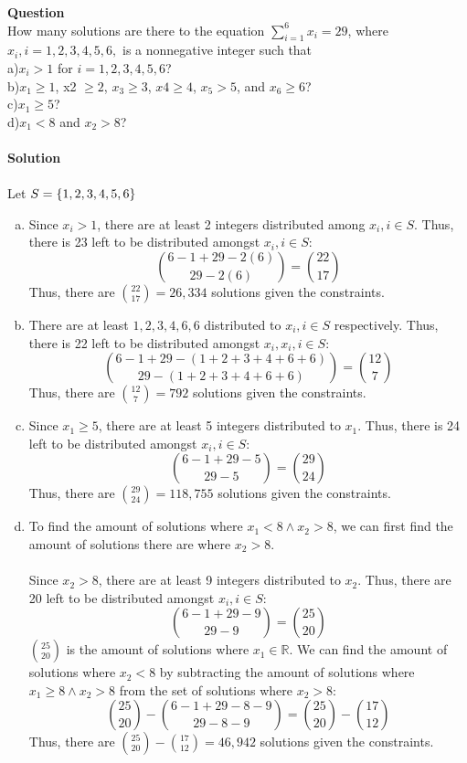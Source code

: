 \documentclass[article, 11pt]{article}
\newcounter{question}
\def\questionnum{{\Large\bfseries{Question \arabic{question} }}\\[1em]}
\newcommand{\question}{
    \stepcounter{question}
    \questionnum
}
\newcommand{\solution}{
    {{\large\bfseries{Solution}}}
}
\DeclarePairedDelimiter\set{\{}{\}}
\newcommand{\reals}{\mathbb{R}} %
\begin{document}
\newpage
\question
How many solutions are there to the equation $\sum_{i=1}^6 x_i=29$, where $x_i, i = 1, 2, 3, 4, 5, 6,$ is a nonnegative integer such that\\ a)$x_i > 1$ for $i = 1, 2, 3, 4, 5, 6$?\\ b)$x_1 \geq 1$, x2 $\geq 2$, $x_3 \geq 3$, $x4 \geq 4$, $x_5 > 5$, and $x_6 \geq 6$?\\ c)$x_1 \geq 5$? \\ d)$x_1 < 8$ and $x_2 > 8$? \\
\\
\solution \\
\\
Let $S=\set*{1,2,3,4,5,6}$
\begin{enumerate}[a)]
    \item 
    Since $x_i > 1$, there are at least 2 integers distributed among $x_i, i \in S$. Thus, there is 23 left to be distributed amongst $x_i, i \in S$:
    \[ \binom{6-1+29-2(6)}{29-2(6)} = \binom{22}{17} \]
    Thus, there are $\binom{22}{17} = 26,334$ solutions given the constraints.
    \item 
    There are at least $1,2,3,4,6,6$ distributed to $x_i, i \in S$ respectively. Thus, there is 22 left to be distributed amongst $x_i, x_i, i \in S$:
    \[ \binom{6-1+29-(1+2+3+4+6+6)}{29-(1+2+3+4+6+6)} = \binom{12}{7} \]
    Thus, there are $\binom{12}{7} = 792$ solutions given the constraints.
    \item
    Since $x_1 \geq 5$, there are at least 5 integers distributed to $x_1$. Thus, there is 24 left to be distributed amongst $x_i, i \in S$: 
    \[ \binom{6-1+29-5}{29-5} = \binom{29}{24} \]    
    Thus, there are $\binom{29}{24} = 118,755$ solutions given the constraints.
    \item 
    To find the amount of solutions where $x_1 < 8 \land x_2 > 8$, we can first find the amount of solutions there are where $x_2 > 8$. \\
    \\
    Since $x_2 > 8$, there are at least 9 integers distributed to $x_2$. Thus, there are 20 left to be distributed amongst $x_i, i \in S$:
    \[ \binom{6-1+29-9}{29-9} = \binom{25}{20} \]
    $\displaystyle\binom{25}{20}$ is the amount of solutions where $x_1 \in \reals$. We can find the amount of solutions where $x_2 < 8$ by subtracting the amount of solutions where $x_1 \geq 8 \land x_2 > 8$ from the set of solutions where $x_2 > 8$:
    \[ \binom{25}{20} - \binom{6 - 1 + 29 - 8 - 9}{29 - 8 - 9} = \binom{25}{20} - \binom{17}{12} \]
    Thus, there are $\binom{25}{20} - \binom{17}{12} = 46,942$ solutions given the constraints.
\end{enumerate}
\end{document}
